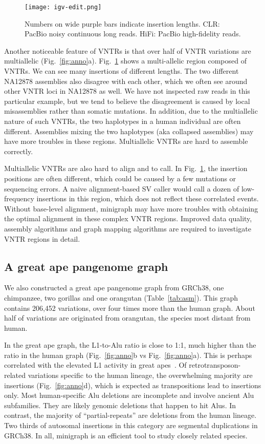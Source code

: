 \documentclass[twocolumn]{bmcart}%
\begin{document}
\begin{figure}
\texttt{[image: igv-edit.png]}
\caption{
  Numbers on wide purple bars indicate insertion lengths. CLR: PacBio noisy
  continuous long reads. HiFi: PacBio high-fidelity reads.}\label{fig:igv}
\end{figure}

Another noticeable feature of VNTRs is that over half of VNTR variations are
multiallelic (Fig.~\ref{fig:anno}a). Fig.~\ref{fig:igv} shows a multi-allelic
region composed of VNTRs. We can see many insertions of different lengths. The
two different NA12878 assemblies also disagree with each other, which we often
see around other VNTR loci in NA12878 as well. We have not inspected raw reads
in this particular example, but we tend to believe the disagreement is caused
by local misassemblies rather than somatic mutations. In addition, due to the
multiallelic nature of such VNTRs, the two haplotypes in a human individual are
often different. Assemblies mixing the two haplotypes (aka collapsed
assemblies) may have more troubles in these regions. Multiallelic VNTRs are
hard to assemble correctly.

Multiallelic VNTRs are also hard to align and to call. In Fig.~\ref{fig:igv},
the insertion positions are often different, which could be caused by a few
mutations or sequencing errors. A naive alignment-based SV caller would call a
dozen of low-frequency insertions in this region, which does not reflect these
correlated events. Without base-level alignment, minigraph may
have more troubles with obtaining the optimal alignment in these complex VNTR
regions. Improved data quality, assembly algorithms and graph mapping
algorithms are required to investigate VNTR regions in detail.

\subsection*{A great ape pangenome graph}

We also constructed a great ape pangenome graph from GRCh38, one chimpanzee,
two gorillas and one orangutan (Table~\ref{tab:asm}). This graph contains
206,452 variations, over four times more than the human graph. About half of
variations are originated from orangutan, the species most distant from human.

In the great ape graph, the L1-to-Alu ratio is close to 1:1, much higher than
the ratio in the human graph (Fig.~\ref{fig:anno}b vs Fig.~\ref{fig:anno}a).
This is perhaps correlated with the elevated L1 activity in great
apes~\cite{Mathews:2003aa}. Of retrotransposon-related variations specific to
the human lineage, the overwhelming majority are insertions
(Fig.~\ref{fig:anno}d), which is expected as transpositions lead to insertions
only.  Most human-specific Alu deletions are incomplete and involve ancient Alu
subfamilies. They are likely genomic deletions that happen to hit Alus. In
contrast, the majority of ``partial-repeats'' are deletions from the human
lineage. Two thirds of autosomal insertions in this category are segmental
duplications in GRCh38. In all, minigraph is an efficient tool to study closely
related species.
\end{document}
